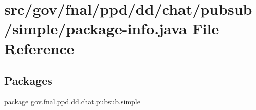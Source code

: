 \hypertarget{gov_2fnal_2ppd_2dd_2chat_2pubsub_2simple_2package-info_8java}{\section{src/gov/fnal/ppd/dd/chat/pubsub/simple/package-\/info.java File Reference}
\label{gov_2fnal_2ppd_2dd_2chat_2pubsub_2simple_2package-info_8java}
}
\subsection*{Packages}
\begin{DoxyCompactItemize}
\item 
package \hyperlink{namespacegov_1_1fnal_1_1ppd_1_1dd_1_1chat_1_1pubsub_1_1simple}{gov.\-fnal.\-ppd.\-dd.\-chat.\-pubsub.\-simple}
\end{DoxyCompactItemize}

